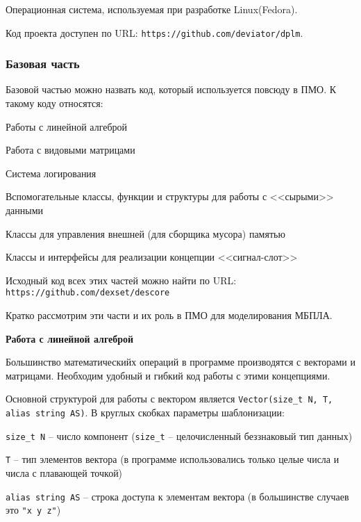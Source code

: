 Операционная система, используемая при разработке Linux(Fedora).

Код проекта доступен по URL: \verb|https://github.com/deviator/dplm|.

\newpage
\subsubsection{Базовая часть}

Базовой частью можно назвать код, который используется повсюду в ПМО.
К такому коду относятся:

\begin{mintemize}
\item Работы с линейной алгеброй
\item Работа с видовыми матрицами
\item Система логирования
\item Вспомогательные классы, функции и структуры для работы с
    <<сырыми>> данными
\item Классы для управления внешней (для сборщика мусора) памятью
\item Классы и интерфейсы для реализации концепции <<сигнал-слот>>
\end{mintemize}

Исходный код всех этих частей можно найти по
\linebreak URL: \verb|https://github.com/dexset/descore|

Кратко рассмотрим эти части и их роль в ПМО для моделирования МБПЛА.

\textbf{Работа с линейной алгеброй}

Большинство математическийх операций в программе производятся с векторами и матрицами.
Необходим удобный и гибкий код работы с этими концепциями.

Основной структурой для работы с вектором является \linebreak
\verb|Vector(size_t N, T, alias string AS)|. В круглых скобках параметры шаблонизации:

\begin{mintemize}
\item \verb|size_t N| -- число компонент (\verb|size_t| -- целочисленный беззнаковый тип данных)
\item \verb|T| -- тип элементов вектора (в программе использовались только целые числа и числа с плавающей точкой)
\item \verb|alias string AS| -- строка доступа к элементам вектора (в большинстве случаев это \verb|"x y z"|)
\end{mintemize}

